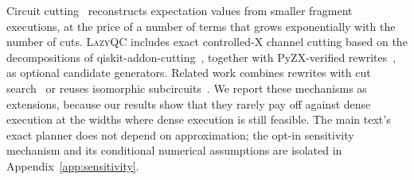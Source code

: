 Circuit cutting~\cite{peng2020simulating,mitarai2021constructing,tang2021cutqc} reconstructs expectation values from smaller fragment executions, at the price of a number of terms that grows exponentially with the number of cuts. \textsc{LazyQC} includes exact controlled-X channel cutting based on the decompositions of qiskit-addon-cutting~\cite{qiskitqpd}, together with PyZX-verified rewrites~\cite{kissinger2019pyzx}, as optional candidate generators. Related work combines rewrites with cut search~\cite{nguyen2025zx} or reuses isomorphic subcircuits~\cite{larqucut2025}. We report these mechanisms as extensions, because our results show that they rarely pay off against dense execution at the widths where dense execution is still feasible. The main text's exact planner does not depend on approximation; the opt-in sensitivity mechanism and its conditional numerical assumptions are isolated in Appendix~\ref{app:sensitivity}.

